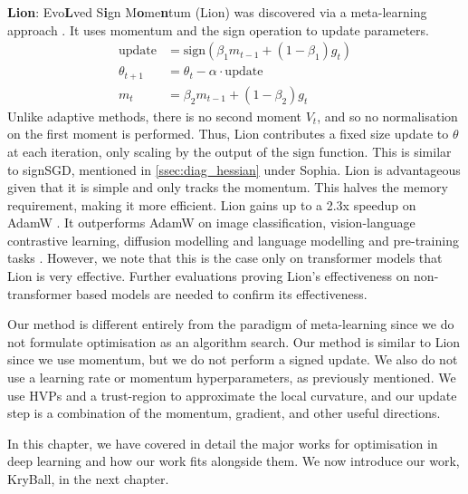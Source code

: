 \textbf{Lion}: Evo\textbf{L}ved S\textbf{i}gn M\textbf{o}me\textbf{n}tum (Lion) was discovered via a meta-learning approach \citep{chen2024symbolic}. It uses momentum and the sign operation to update parameters.
\begin{align}
    \text{update} &= \text{sign}(\beta_1 m_{t-1} + (1 - \beta_1)g_t) \\ 
    \theta_{t+1} &= \theta_t - \alpha \cdot \text{update} \\ 
    m_t &= \beta_2 m_{t-1} + (1 - \beta_2)g_t
\end{align}
Unlike adaptive methods, there is no second moment $V_t$, and so no normalisation on the first moment is performed. Thus, Lion contributes a fixed size update to $\theta$ at each iteration, only scaling by the output of the $\text{sign}$ function. This is similar to signSGD, mentioned in \cref{ssec:diag_hessian} under Sophia. Lion is advantageous given that it is simple and only tracks the momentum. This halves the memory requirement, making it more efficient. Lion gains up to a 2.3x speedup on AdamW \citep{chen2024symbolic}. It outperforms AdamW on image classification, vision-language contrastive learning, diffusion modelling and language modelling and pre-training tasks \citep{chen2024symbolic}. However, we note that this is the case only on transformer models that Lion is very effective. Further evaluations proving Lion's effectiveness on non-transformer based models are needed to confirm its effectiveness.

Our method is different entirely from the paradigm of meta-learning since we do not formulate optimisation as an algorithm search. Our method is similar to Lion since we use momentum, but we do not perform a signed update. We also do not use a learning rate or momentum hyperparameters, as previously mentioned. We use HVPs and a trust-region to approximate the local curvature, and our update step is a combination of the momentum, gradient, and other useful directions. 

In this chapter, we have covered in detail the major works for optimisation in deep learning and how our work fits alongside them. We now introduce our work, KryBall, in the next chapter. 